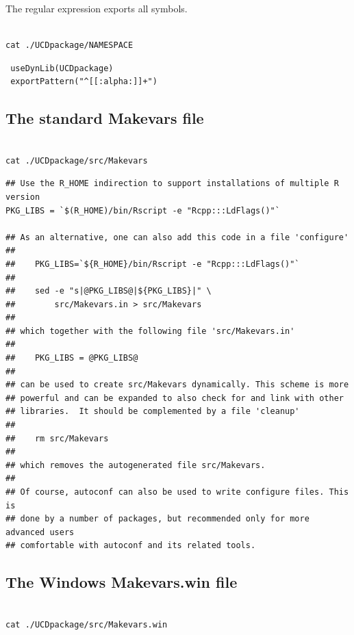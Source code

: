 \documentclass[11pt]{article}
\begin{document}
The regular expression exports all symbols.


\begin{verbatim}

cat ./UCDpackage/NAMESPACE
\end{verbatim}

\begin{verbatim}
 useDynLib(UCDpackage)
 exportPattern("^[[:alpha:]]+")
\end{verbatim}
\subsection{The standard Makevars file}
\label{sec-8-8}



\begin{verbatim}

cat ./UCDpackage/src/Makevars
\end{verbatim}


\begin{verbatim}
## Use the R_HOME indirection to support installations of multiple R version
PKG_LIBS = `$(R_HOME)/bin/Rscript -e "Rcpp:::LdFlags()"`

## As an alternative, one can also add this code in a file 'configure'
##
##    PKG_LIBS=`${R_HOME}/bin/Rscript -e "Rcpp:::LdFlags()"`
## 
##    sed -e "s|@PKG_LIBS@|${PKG_LIBS}|" \
##        src/Makevars.in > src/Makevars
## 
## which together with the following file 'src/Makevars.in'
##
##    PKG_LIBS = @PKG_LIBS@
##
## can be used to create src/Makevars dynamically. This scheme is more
## powerful and can be expanded to also check for and link with other
## libraries.  It should be complemented by a file 'cleanup'
##
##    rm src/Makevars
##
## which removes the autogenerated file src/Makevars. 
##
## Of course, autoconf can also be used to write configure files. This is
## done by a number of packages, but recommended only for more advanced users
## comfortable with autoconf and its related tools.
\end{verbatim}
\subsection{The Windows Makevars.win file}
\label{sec-8-9}



\begin{verbatim}

cat ./UCDpackage/src/Makevars.win
\end{verbatim}
\end{document}
